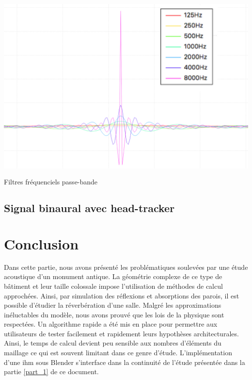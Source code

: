 \begin{figureth}
	\includegraphics[width=0.9\linewidth]{images/filtres}
	\caption{Filtres fréquenciels passe-bande}
	\label{filtres}
\end{figureth}

\section{Signal binaural avec head-tracker}



	
\chapter*{Conclusion}

Dans cette partie, nous avons présenté les problématiques soulevées par une étude acoustique d'un monument antique. La géométrie complexe de ce type de bâtiment et leur taille colossale impose l'utilisation de méthodes de calcul approchées. Ainsi, par simulation des réflexions et absorptions des parois, il est possible d'étudier la réverbération d'une salle. Malgré les approximations inéluctables du modèle, nous avons prouvé que les lois de la physique sont respectées. Un algorithme rapide a été mis en place pour permettre aux utilisateurs de tester facilement et rapidement leurs hypothèses architecturales. Ainsi, le temps de calcul devient peu sensible aux nombres d'éléments du maillage ce qui est souvent limitant dans ce genre d'étude. L'implémentation d'une \gls{ihm} sous Blender s'interface dans la continuité de l'étude présentée dans la partie \ref{part_1} de ce document. 

